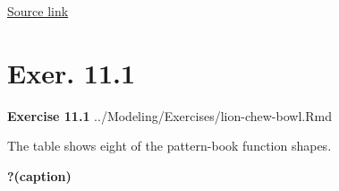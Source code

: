 \documentclass[
  letterpaper,
  DIV=11,
  numbers=noendperiod,
  oneside]{article}
\begin{document}
\begin{multicols}{2}
\begin{figure}
{}

\end{figure}

\href{https://www.weather.gov/images/oun/wxsafety/summerwx/heatindex.gif}{Source
link}

\hypertarget{exer.-11.1}{%
\section*{Exer. 11.1}\label{exer.-11.1}}

\textbf{Exercise 11.1} ../Modeling/Exercises/lion-chew-bowl.Rmd

The table shows eight of the pattern-book function shapes.

\begin{table}

\caption{\textbf{?(caption)}}\begin{minipage}[t]{\linewidth}

{\centering 

}
\end{minipage}
\end{table}
\end{multicols}
\end{document}
